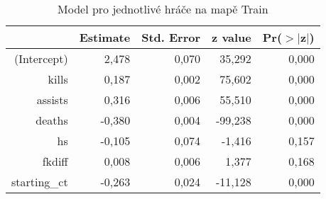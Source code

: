 \begin{table}[H]
\centering
\begin{tabular}{rrrrr}
  \hline
 & Estimate & Std. Error & z value & Pr($>$$|$z$|$) \\ 
  \hline
(Intercept) & 2,478 & 0,070 & 35,292 & 0,000 \\ 
  kills & 0,187 & 0,002 & 75,602 & 0,000 \\ 
  assists & 0,316 & 0,006 & 55,510 & 0,000 \\ 
  deaths & -0,380 & 0,004 & -99,238 & 0,000 \\ 
  hs & -0,105 & 0,074 & -1,416 & 0,157 \\ 
  fkdiff & 0,008 & 0,006 & 1,377 & 0,168 \\ 
  starting\_ct & -0,263 & 0,024 & -11,128 & 0,000 \\ 
   \hline
\end{tabular}
\caption{\label{tab:player_model_Train}Model pro jednotlivé hráče na mapě Train} 
\end{table}
